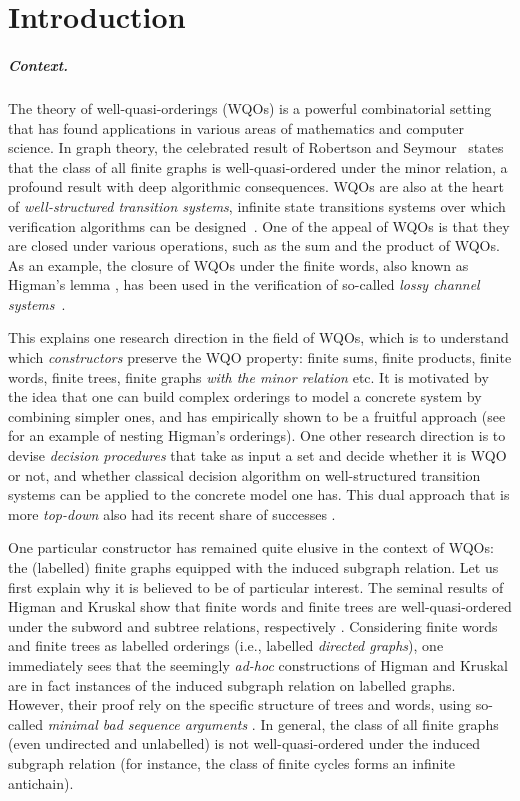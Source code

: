 \section{Introduction}
\label{sec:introduction}

\subparagraph{Context.} The theory of well-quasi-orderings (WQOs) is a powerful
combinatorial setting that has found applications in various areas of
mathematics and computer science. In graph theory, the celebrated result of
Robertson and Seymour~\cite{ROBSEY04} states that the class of all finite
graphs is well-quasi-ordered under the minor relation, a profound result with
deep algorithmic consequences. WQOs are also at the heart of
\emph{well-structured transition systems}, infinite state transitions systems
over which verification algorithms can be designed~\cite{ABDU96,ABDU98}. One of
the appeal of WQOs is that they are closed under various operations, such as
the sum and the product of WQOs. As an example, the closure of WQOs under the
finite words, also known as Higman's lemma \cite{HIG52}, has been used in the
verification of so-called \emph{lossy channel systems}~\cite{ABDU93}. 

This explains one research direction in the field of WQOs, which is to
understand which \emph{constructors} preserve the WQO property: finite sums,
finite products, finite words, finite trees, finite graphs \emph{with the minor
relation} etc. It is motivated by the idea that one can build complex orderings
to model a concrete system by combining simpler ones, and has empirically shown
to be a fruitful approach (see \cite{HSS13} for an example of nesting Higman's
orderings). One other research direction is to devise \emph{decision
procedures} that take as input a set and decide whether it is WQO or not, and
whether classical decision algorithm on well-structured transition systems can
be applied to the concrete model one has. This dual approach that is more
\emph{top-down} also had its recent share of successes \cite{FINGU19,LOPEZ24}.

One particular constructor has remained quite elusive in the context of WQOs:
the (labelled) finite graphs equipped with the induced subgraph relation. Let
us first explain why it is believed to be of particular interest. The seminal
results of Higman and Kruskal show that finite words and finite trees are
well-quasi-ordered under the subword and subtree relations, respectively
\cite{HIG52,KRU72}. Considering finite words and finite trees as labelled
orderings (i.e., labelled \emph{directed graphs}), one immediately sees that
the seemingly \emph{ad-hoc} constructions of Higman and Kruskal are in fact
instances of the induced subgraph relation on labelled graphs. However, their
proof rely on the specific structure of trees and words, using so-called
\emph{minimal bad sequence arguments} \cite{NASH65}. In general, the class of
all finite graphs (even undirected and unlabelled) is not well-quasi-ordered
under the induced subgraph relation (for instance, the class of finite cycles
forms an infinite antichain).



